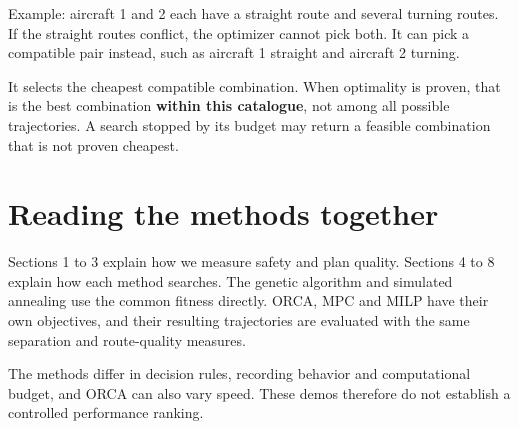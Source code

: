\documentclass[10pt,a4paper]{article}
\begin{document}
Example: aircraft 1 and 2 each have a straight route and several turning routes. If the straight routes conflict, the optimizer cannot pick both. It can pick a compatible pair instead, such as aircraft 1 straight and aircraft 2 turning.

It selects the cheapest compatible combination. When optimality is proven, that is the best combination \textbf{within this catalogue}, not among all possible trajectories. A search stopped by its budget may return a feasible combination that is not proven cheapest.

\section*{Reading the methods together}
Sections 1 to 3 explain how we measure safety and plan quality. Sections 4 to 8 explain how each method searches. The genetic algorithm and simulated annealing use the common fitness directly. ORCA, MPC and MILP have their own objectives, and their resulting trajectories are evaluated with the same separation and route-quality measures.

The methods differ in decision rules, recording behavior and computational budget, and ORCA can also vary speed. These demos therefore do not establish a controlled performance ranking.
\end{document}
